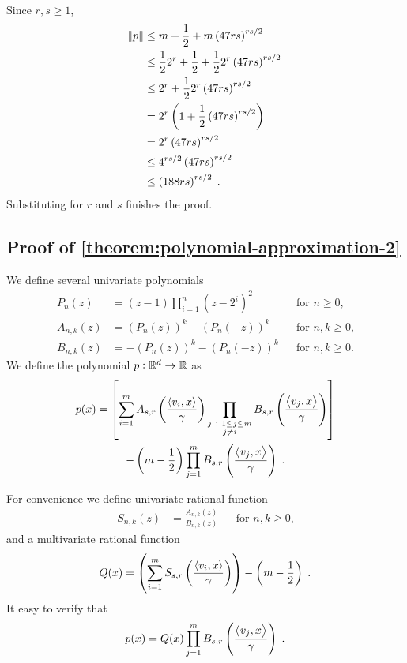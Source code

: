 Since $r,s \ge 1$,
\begin{align*}
\norm{p}
& \le m + \frac{1}{2} + m \left(47 rs \right)^{rs/2} \\
& \le \frac{1}{2} 2^r + \frac{1}{2} + \frac{1}{2} 2^r \left(47 rs \right)^{rs/2} \\
& \le 2^r + \frac{1}{2} 2^r \left(47 rs \right)^{rs/2} \\
& = 2^r \left(1 + \frac{1}{2} \left(47 rs \right)^{rs/2} \right) \\
& = 2^r \left(47 rs \right)^{rs/2} \\
& \le 4^{rs/2} \left(47 rs \right)^{rs/2} \\
& \le \left(188 rs \right)^{rs/2} \; .
\end{align*}
Substituting for $r$ and $s$ finishes the proof.


\subsection{Proof of \autoref{theorem:polynomial-approximation-2}}
\label{section:proof-of-polynomial-approximation-2}

We define several univariate polynomials
\begin{align*}
P_n(z) & = (z - 1) \prod_{i=1}^n (z - 2^i)^2 && \text{for $n \ge 0$,} \\
A_{n,k}(z) & = (P_n(z))^k - (P_n(-z))^k && \text{for $n,k \ge 0$,} \\
B_{n,k}(z) & = - (P_n(z))^k - (P_n(-z))^k && \text{for $n,k \ge 0$.}
\end{align*}
We define the polynomial $p:\mathbb{R}^d \to \mathbb{R}$ as
\begin{multline*}
p(x) = \left[ \sum_{i=1}^m A_{s,r}\left( \frac{\left\langle v_i, x \right\rangle}{\gamma} \right) \prod_{\substack{j ~:~ 1 \le j \le m \\ j \neq i}} B_{s,r} \left( \frac{\left\langle v_j, x \right\rangle}{\gamma} \right) \right] \\
- \left(m - \frac{1}{2} \right) \prod_{j=1}^m B_{s,r} \left( \frac{\left\langle v_j, x \right\rangle}{\gamma} \right) \; .
\end{multline*}

For convenience we define univariate rational function
\begin{align*}
S_{n,k}(z) & = \frac{A_{n,k}(z)}{B_{n,k}(z)} && \text{for $n,k \ge 0$,}
\end{align*}
and a multivariate rational function
$$
Q(x) = \left( \sum_{i=1}^m S_{s,r}\left( \frac{\left\langle v_i, x \right\rangle}{\gamma} \right) \right) - \left(m - \frac{1}{2} \right) \; .
$$
It easy to verify that
$$
p(x) = Q(x) \prod_{j=1}^m B_{s,r} \left( \frac{\left\langle v_j, x \right\rangle}{\gamma} \right) \; .
$$

